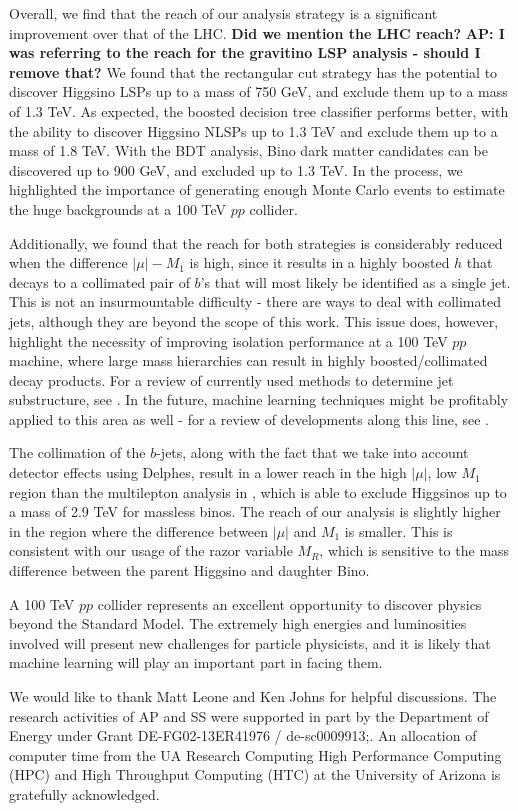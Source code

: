 \documentclass[a4paper,11pt]{article}
\newcommand{\Shufang}[1]{{\bf\color{Maroon}  #1}}
\newcommand{\Adarsh}[1]{{\bf\color{RoyalBlue} AP: #1}}
\begin{document}
Overall, we find that the reach of our analysis strategy is a significant
improvement over that of the LHC.  \Shufang{Did we mention the LHC reach?}
\Adarsh{I was referring to the reach for the gravitino LSP analysis - should I
remove that?}  We found that the rectangular cut strategy has
the potential to discover Higgsino LSPs up to a mass of 750 GeV, and exclude
them up to a mass of 1.3 TeV. As expected, the boosted decision tree classifier
performs better, with the ability to discover Higgsino NLSPs up to 1.3 TeV and
exclude them up to a mass of 1.8 TeV. With the BDT analysis, Bino dark matter
candidates can be discovered up to 900 GeV, and excluded up to 1.3 TeV. In the
process, we highlighted the importance of generating enough Monte Carlo events
to estimate the huge backgrounds at a 100 TeV $pp$ collider. 

Additionally, we found that the reach for both strategies is considerably
reduced when the difference $ |\mu|-M_1$ is high, since it results in a highly
boosted $h$ that decays to a collimated pair of $b$'s that will most likely be
identified as a single jet. This is not an insurmountable difficulty - there are
ways to deal with collimated jets, although they are beyond the scope of this
work. This issue does, however, highlight the necessity of improving isolation
performance at a 100 TeV $pp$ machine, where large mass hierarchies can result in
highly boosted/collimated decay products. For a review of currently used methods
to determine jet substructure, see \citep{Shelton:2013an}. In the future,
machine learning techniques might be profitably applied to this area as well -
for a review of developments along this line, see \citep{Schwartzman:2016jqu}. 

The collimation of the $b$-jets, along with the fact that we take into account
detector effects using Delphes, result in a lower reach in the high $|\mu|$, low
$M_1$ region than the multilepton analysis in \citep{Gori:2014oua}, which is
able to exclude Higgsinos up to a mass of 2.9 TeV for massless binos. The reach
of our analysis is slightly higher in the region where the difference between
$|\mu|$ and $M_1$ is smaller. This is consistent with our usage of the razor
variable $M_R$, which is sensitive to the mass difference between the parent
Higgsino and daughter Bino.

A 100 TeV $pp$ collider represents an excellent opportunity to discover
physics beyond the Standard Model. The extremely high energies and luminosities
involved will present new challenges for particle physicists, and it is likely
that machine learning will play an important part in facing them. 
  
\acknowledgments

We would like to thank Matt Leone and Ken Johns for helpful discussions.  The
research activities of AP and SS were supported in part by the Department of
Energy under Grant DE-FG02-13ER41976 / de-sc0009913;. An allocation of computer
time from the UA Research Computing High Performance Computing (HPC) and High
Throughput Computing (HTC) at the University of Arizona is gratefully
acknowledged.


\end{document}
